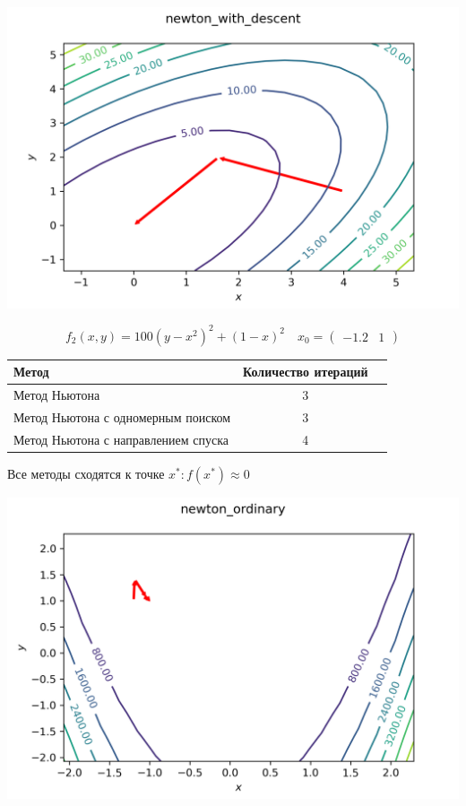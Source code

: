 \documentclass[english]{article}
\begin{document}
\begin{center}
  \includegraphics[scale=0.7]{plots/contours_newton_with_descent_4.png}
\end{center}
\[ f_2(x, y) = 100(y - x^2)^2 + (1 - x)^2 \quad x_0 = \begin{pmatrix}
  -1.2 & 1
\end{pmatrix}\]
\begin{center}
  \begin{longtable}{l|cc}
    Метод & Количество итераций \\
    \hline
    Метод Ньютона & 3 \\
    \hline
    Метод Ньютона с одномерным поиском & 3 \\
    \hline
    Метод Ньютона с направлением спуска &  4 \\
  \end{longtable}
\end{center}
Все методы сходятся к точке \(x^*: f(x^*) \approx 0\)
\begin{center}
  \includegraphics[scale=0.7]{plots/contours_newton_ordinary_5.png}
\end{center}
\end{document}
